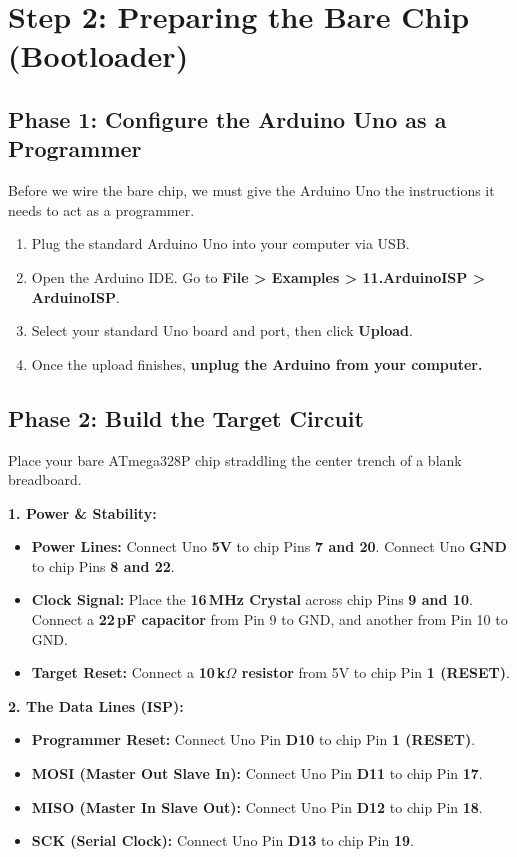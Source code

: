 \documentclass[11pt,a4paper]{article}
\begin{document}
\section{Step 2: Preparing the Bare Chip (Bootloader)}

\subsection*{Phase 1: Configure the Arduino Uno as a Programmer}
Before we wire the bare chip, we must give the Arduino Uno the instructions it needs to act as a programmer.
\begin{enumerate}
    \item Plug the standard Arduino Uno into your computer via USB.
    \item Open the Arduino IDE. Go to \textbf{File > Examples > 11.ArduinoISP > ArduinoISP}.
    \item Select your standard Uno board and port, then click \textbf{Upload}.
    \item Once the upload finishes, \textbf{unplug the Arduino from your computer.}
\end{enumerate}

\subsection*{Phase 2: Build the Target Circuit}
Place your bare ATmega328P chip straddling the center trench of a blank breadboard. 

\textbf{1. Power \& Stability:}
\begin{itemize}
    \item \textbf{Power Lines:} Connect Uno \textbf{5V} to chip Pins \textbf{7 and 20}. Connect Uno \textbf{GND} to chip Pins \textbf{8 and 22}.
    \item \textbf{Clock Signal:} Place the \textbf{16\,MHz Crystal} across chip Pins \textbf{9 and 10}. Connect a \textbf{22\,pF capacitor} from Pin 9 to GND, and another from Pin 10 to GND.
    \item \textbf{Target Reset:} Connect a \textbf{10\,k$\Omega$ resistor} from 5V to chip Pin \textbf{1 (RESET)}.
\end{itemize}

\textbf{2. The Data Lines (ISP):}
\begin{itemize}
    \item \textbf{Programmer Reset:} Connect Uno Pin \textbf{D10} to chip Pin \textbf{1 (RESET)}.
    \item \textbf{MOSI (Master Out Slave In):} Connect Uno Pin \textbf{D11} to chip Pin \textbf{17}.
    \item \textbf{MISO (Master In Slave Out):} Connect Uno Pin \textbf{D12} to chip Pin \textbf{18}.
    \item \textbf{SCK (Serial Clock):} Connect Uno Pin \textbf{D13} to chip Pin \textbf{19}.
\end{itemize}
\end{document}
